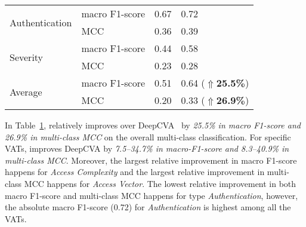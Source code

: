\begin{table}[t]
\begin{center}
\begin{tabular}{l|p{1.9cm}<{\centering}|p{1.5cm}<{\centering}|p{1.5cm}<{\centering}}
			\hline
			\multirow{2}{*}{Authentication}  & macro F1-score                             &   0.67         & 0.72\\
			\cline{2-4}
			                                 & MCC                                 &   0.36         & 0.39\\
			\hline
			\multirow{2}{*}{Severity}        & macro F1-score                             &   0.44         & 0.58\\
			\cline{2-4}
			                                 & MCC                                 &   0.23         & 0.28\\
			\hline
			\hline
			\multirow{2}{*}{Average}         & macro F1-score                             &    0.51        & 0.64 ($\Uparrow${\bf 25.5\%})\\
			\cline{2-4}
			                                 & MCC                                 & 0.20           & 0.33 ($\Uparrow${\bf 26.9\%})\\
            \hline
		\end{tabular}
		\label{rq1_results}
	\end{center}
\end{table}

In Table~\ref{rq1_results}, {\tool} relatively improves over
DeepCVA~\cite{deepCVA-ase21} by {\em 25.5\% in macro F1-score and
26.9\% in multi-class MCC} on the overall multi-class 
classification. For specific VATs, {\tool} improves
DeepCVA by {\em 7.5--34.7\% in macro-F1-score and 8.3--40.9\% in
multi-class MCC}. Moreover, the largest relative improvement in macro
F1-score happens for {\em Access Complexity} and the largest relative
improvement in multi-class MCC happens for {\em Access Vector}. The
lowest relative improvement in both macro F1-score and multi-class MCC
happens for type {\em Authentication}, however, the absolute macro
F1-score (0.72) for {\em Authentication} is highest among all the
VATs.



